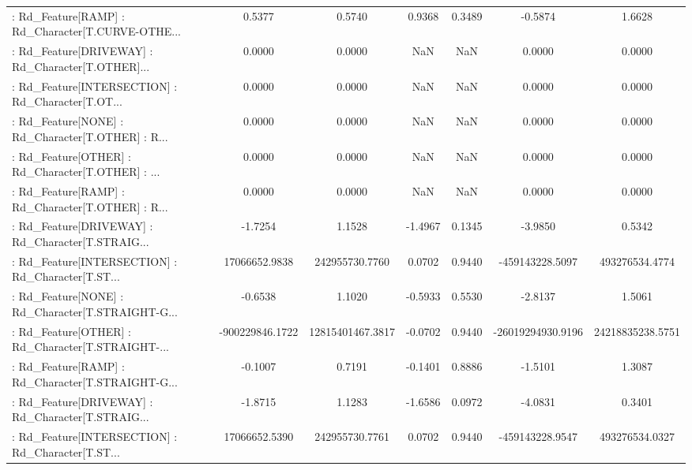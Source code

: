\begin{longtable}{p{4cm}cccccc}
 : Rd\_Feature[RAMP] : Rd\_Character[T.CURVE-OTHE... &            0.5377 &            0.5740 &  0.9368 &       0.3489 &            -0.5874 &            1.6628 \\
 : Rd\_Feature[DRIVEWAY] : Rd\_Character[T.OTHER]... &            0.0000 &            0.0000 &     NaN &          NaN &             0.0000 &            0.0000 \\
 : Rd\_Feature[INTERSECTION] : Rd\_Character[T.OT... &            0.0000 &            0.0000 &     NaN &          NaN &             0.0000 &            0.0000 \\
 : Rd\_Feature[NONE] : Rd\_Character[T.OTHER] : R... &            0.0000 &            0.0000 &     NaN &          NaN &             0.0000 &            0.0000 \\
 : Rd\_Feature[OTHER] : Rd\_Character[T.OTHER] : ... &            0.0000 &            0.0000 &     NaN &          NaN &             0.0000 &            0.0000 \\
 : Rd\_Feature[RAMP] : Rd\_Character[T.OTHER] : R... &            0.0000 &            0.0000 &     NaN &          NaN &             0.0000 &            0.0000 \\
 : Rd\_Feature[DRIVEWAY] : Rd\_Character[T.STRAIG... &           -1.7254 &            1.1528 & -1.4967 &       0.1345 &            -3.9850 &            0.5342 \\
 : Rd\_Feature[INTERSECTION] : Rd\_Character[T.ST... &     17066652.9838 &    242955730.7760 &  0.0702 &       0.9440 &    -459143228.5097 &    493276534.4774 \\
 : Rd\_Feature[NONE] : Rd\_Character[T.STRAIGHT-G... &           -0.6538 &            1.1020 & -0.5933 &       0.5530 &            -2.8137 &            1.5061 \\
 : Rd\_Feature[OTHER] : Rd\_Character[T.STRAIGHT-... &   -900229846.1722 &  12815401467.3817 & -0.0702 &       0.9440 &  -26019294930.9196 &  24218835238.5751 \\
 : Rd\_Feature[RAMP] : Rd\_Character[T.STRAIGHT-G... &           -0.1007 &            0.7191 & -0.1401 &       0.8886 &            -1.5101 &            1.3087 \\
 : Rd\_Feature[DRIVEWAY] : Rd\_Character[T.STRAIG... &           -1.8715 &            1.1283 & -1.6586 &       0.0972 &            -4.0831 &            0.3401 \\
 : Rd\_Feature[INTERSECTION] : Rd\_Character[T.ST... &     17066652.5390 &    242955730.7761 &  0.0702 &       0.9440 &    -459143228.9547 &    493276534.0327 \\

\end{longtable}
